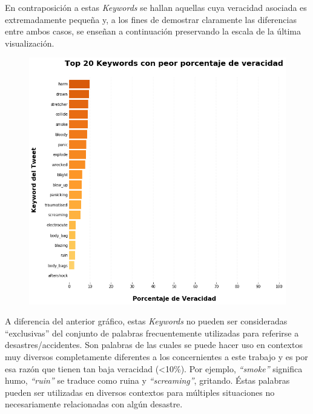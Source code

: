 \documentclass[titlepage,a4paper]{article}
\begin{document}
    En contraposición a estas \textit{Keywords} se hallan aquellas cuya veracidad asociada es extremadamente pequeña y, a los fines de demostrar claramente las diferencias entre ambos casos, se enseñan a continuación preservando la escala de la última visualización.
    
    \begin{figure}[H]
    \centering
    \includegraphics[width=1\textwidth]{graficos/Analisis de Keyword/top_20_keywords_con_peor_porcentaje_de_veracidad.png}
    \caption{} 
    \end{figure}
    
    A diferencia del anterior gráfico, estas \textit{Keywords} no pueden ser consideradas ``exclusivas'' del conjunto de palabras frecuentemente utilizadas para referirse a desastres/accidentes. Son palabras de las cuales se puede hacer uso en contextos muy diversos completamente diferentes a los concernientes a este trabajo y es por esa razón que tienen tan baja veracidad (<10\%). Por ejemplo, \textit{``smoke''} significa humo, \textit{``ruin''} se traduce como ruina y \textit{``screaming''}, gritando. Éstas palabras pueden ser utilizadas en diversos contextos para múltiples situaciones no necesariamente relacionadas con algún desastre.  
    
    
\end{document}
